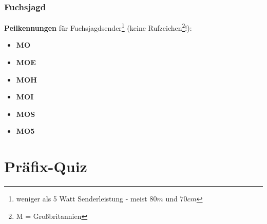 \begin{frame}
    \frametitle{Fuchsjagd}
    
    \textbf{Peilkennungen} für Fuchsjagdsender\footnote{weniger als 5 Watt
    Senderleistung - meist $80m$ und $70cm$} (keine Rufzeichen\footnote{M = Großbritannien}!):
  
    \begin{itemize}
        \item \textbf{MO}
        \item \textbf{MOE}
        \item \textbf{MOH}
        \item \textbf{MOI}
        \item \textbf{MOS}
        \item \textbf{MO5}
    \end{itemize}

\end{frame}

\section{Präfix-Quiz}


